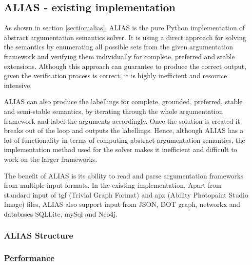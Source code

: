 \subsection{ALIAS - existing implementation}
As shown in section \ref{section:alias}, ALIAS \citep{alias} is the pure Python implementation of abstract argumentation semantics solver. It is using a direct approach for solving the semantics by enumerating all possible sets from the given argumentation framework and verifying them individually for complete, preferred and stable extensions. Although this approach can guarantee to produce the correct output, given the verification process is correct, it is highly inefficient and resource intensive. 

ALIAS can also produce the labellings for complete, grounded, preferred, stable and semi-stable semantics, by iterating through the whole argumentation framework and label the arguments accordingly. Once the solution is created it breaks out of the loop and outputs the labellings. Hence, although ALIAS has a lot of functionality in terms of computing abstract argumentation semantics, the implementation method used for the solver makes it inefficient and difficult to work on the larger frameworks. 

The benefit of ALIAS is its ability to read and parse argumentation frameworks from multiple input formats. In the existing implementation, Apart from standard input of tgf (Trivial Graph Format) and apx (Ability Photopaint Studio Image) files, ALIAS also support input from JSON, DOT graph, networkx and databases SQLLite, mySql and Neo4j. 


\subsubsection{ALIAS Structure}

\subsubsection{Performance}
